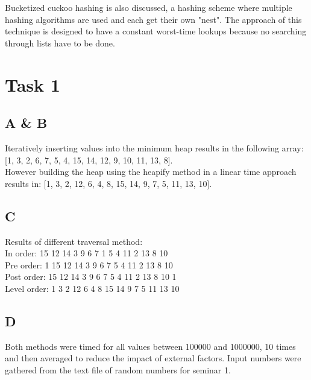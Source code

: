 \documentclass{article}
\begin{document}
Bucketized cuckoo hashing is also discussed, a hashing scheme where multiple hashing algorithms are used and each get their own "nest". The approach of this technique is designed to have a constant worst-time lookups because no searching through lists have to be done. 

\section{Task 1}

\subsection{A \& B}

Iteratively inserting values into the minimum heap results in the following array: [1, 3, 2, 6, 7, 5, 4, 15, 14, 12, 9, 10, 11, 13, 8]. \\

However building the heap using the heapify method in a linear time approach results in: [1, 3, 2, 12, 6, 4, 8, 15, 14, 9, 7, 5, 11, 13, 10]. 

\subsection{C}

Results of different traversal method: \\
In order: 15 12 14 3 9 6 7 1 5 4 11 2 13 8 10 \\
Pre order: 1 15 12 14 3 9 6 7 5 4 11 2 13 8 10 \\
Post order: 15 12 14 3 9 6 7 5 4 11 2 13 8 10 1 \\
Level order: 1 3 2 12 6 4 8 15 14 9 7 5 11 13 10 \\

\newpage
\subsection{D}

Both methods were timed for all values between 100000 and 1000000, 10 times and then averaged to reduce the impact of external factors. Input numbers were gathered from the text file of random numbers for seminar 1.
\end{document}
